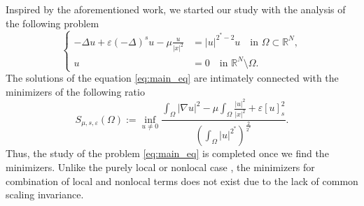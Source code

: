 \documentclass[11pt]{article}
\begin{document}
Inspired by the aforementioned work, we started our study with the analysis of the following problem
\begin{equation}\label{eq:main_eq}
\left\{
\begin{aligned}
    -\Delta u + \varepsilon(-\Delta)^s u - \mu \frac{u}{|x|^2} &=|u|^{2^*-2} u \quad \text{in } \Omega \subset \mathbb{R}^N, \\
    u &= 0 \quad \text{in } \mathbb{R}^N \setminus \Omega.
\end{aligned}
\right.
\end{equation}
The solutions of the equation \eqref{eq:main_eq} are intimately connected with the minimizers of the following ratio
\begin{equation} \label{eq:spectral_ratio_frac}
S_{\mu, s,\varepsilon}(\Omega) := \inf_{u \neq 0} 
\frac{\displaystyle\int_{\Omega} |\nabla u|^2 - \mu \int_{\Omega} \frac{|u|^2}{|x|^2} + \varepsilon[u]_{s}^2}
{\left(\displaystyle\int_{\Omega} |u|^{2^*} \right)^{\frac{2}{2^*}}}.
\end{equation}
Thus, the study of the problem \eqref{eq:main_eq} is completed once we find the minimizers. Unlike the purely local \cite{terracini_minimizers} or nonlocal case \cite{cotsiolis2004best_fractional}, the minimizers for combination of local and nonlocal terms does not exist due to the lack of common scaling invariance. 
\end{document}
